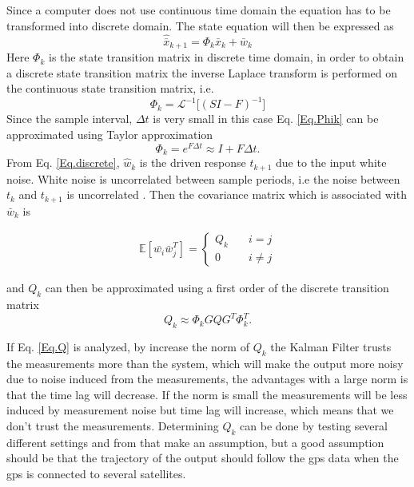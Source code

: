 Since a computer does not use continuous time domain the equation has to be transformed into discrete domain. The state equation will then be expressed as
\begin{equation}
\hat{\bar{x}}_{k+1} = \Phi_k \bar{x}_k +  \bar{w}_k	
\label{Eq.discrete}
\end{equation}
Here $\Phi_k$ is the state transition matrix in discrete time domain, in order to obtain a discrete state transition matrix the inverse Laplace transform is performed on the continuous state transition matrix, i.e.
\begin{equation}
\Phi_k = \mathcal{L}^{-1}\big[(SI-F)^{-1}\big]
\label{Eq.Phik}
\end{equation}
Since the sample interval, $\Delta t$ is very small in this case Eq. \eqref{Eq.Phik} can be approximated using Taylor approximation 
\begin{equation}
\Phi_k = e^{F\Delta t} \approx I + F \Delta t 
\label{Eq.Final_Phik}.
\end{equation}
From Eq. \eqref{Eq.discrete}, $\hat{w}_k$ is the driven response $t_{k+1}$ due to the input white noise. White noise is uncorrelated between sample periods, i.e the noise between $t_k$ and $t_{k+1}$ is uncorrelated \cite{signal_process}. Then the covariance matrix which is associated with $\bar{w}_k$ is \cite{signal_process}

\begin{align}
\mathbb{E}[\bar{w_i}\bar{w}_j^T] =
\begin{cases}
  Q_k &\quad i=j\\    
  0 &\quad i\neq j   
\end{cases}
\end{align}

and $Q_k$ can then be approximated using a first order of the discrete transition matrix \cite{Discrete_kalman}
\begin{equation}
Q_k\approx \Phi_k GQG^T \Phi_k^T.
\label{Eq.Q_k}
\end{equation}

If Eq. \eqref{Eq.Q} is analyzed, by increase the norm of $Q_k$ the Kalman Filter trusts the measurements more than the system, which will make the output more noisy due to noise induced from the measurements, the advantages with a large norm is that the time lag will decrease. If the norm is small the measurements will be less induced by measurement noise but time lag will increase, which means that we don't trust the measurements. Determining $Q_k$ can be done by testing several different settings and from that make an assumption, but a good assumption should be that the trajectory of the output should follow the \gls{gps} data when the \gls{gps} is connected to several satellites.\\



